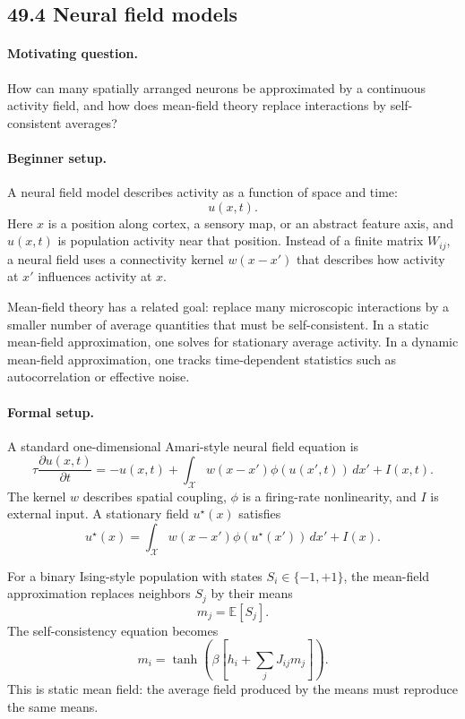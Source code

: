 \subsection{49.4 Neural field models}

\paragraph{Motivating question.}
How can many spatially arranged neurons be approximated by a continuous activity field, and how does mean-field theory replace interactions by self-consistent averages?

\paragraph{Beginner setup.}
A neural field model describes activity as a function of space and time:
\[
u(x,t).
\]
Here \(x\) is a position along cortex, a sensory map, or an abstract feature axis, and \(u(x,t)\) is population activity near that position. Instead of a finite matrix \(W_{ij}\), a neural field uses a connectivity kernel \(w(x-x')\) that describes how activity at \(x'\) influences activity at \(x\).

Mean-field theory has a related goal: replace many microscopic interactions by a smaller number of average quantities that must be self-consistent. In a static mean-field approximation, one solves for stationary average activity. In a dynamic mean-field approximation, one tracks time-dependent statistics such as autocorrelation or effective noise.

\paragraph{Formal setup.}
A standard one-dimensional Amari-style neural field equation is
\[
\boxed{
\tau\frac{\partial u(x,t)}{\partial t}
=-u(x,t)
+\int_{\mathcal X} w(x-x')\phi(u(x',t))\,dx'
+I(x,t).
}
\]
The kernel \(w\) describes spatial coupling, \(\phi\) is a firing-rate nonlinearity, and \(I\) is external input. A stationary field \(u^\star(x)\) satisfies
\[
u^\star(x)
=\int_{\mathcal X} w(x-x')\phi(u^\star(x'))\,dx'
+I(x).
\]

For a binary Ising-style population with states \(S_i\in\{-1,+1\}\), the mean-field approximation replaces neighbors \(S_j\) by their means
\[
m_j=\mathbb E[S_j].
\]
The self-consistency equation becomes
\[
\boxed{
m_i=\tanh\left(\beta\left[h_i+\sum_j J_{ij}m_j\right]\right).
}
\]
This is static mean field: the average field produced by the means must reproduce the same means.

